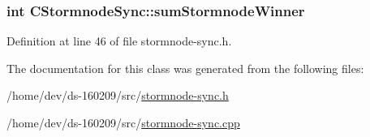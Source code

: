 \subsubsection[{sum\+Stormnode\+Winner}]{\setlength{\rightskip}{0pt plus 5cm}int C\+Stormnode\+Sync\+::sum\+Stormnode\+Winner}\label{class_c_stormnode_sync_a37b84e2f05256e44f9d0c80a87b26895}


Definition at line 46 of file stormnode-\/sync.\+h.



The documentation for this class was generated from the following files\+:\begin{DoxyCompactItemize}
\item 
/home/dev/ds-\/160209/src/\hyperlink{stormnode-sync_8h}{stormnode-\/sync.\+h}\item 
/home/dev/ds-\/160209/src/\hyperlink{stormnode-sync_8cpp}{stormnode-\/sync.\+cpp}\end{DoxyCompactItemize}
